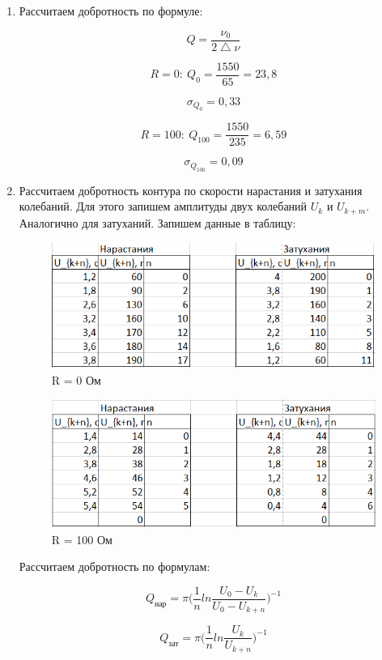 \documentclass[a4paper, 12pt]{article}%
\begin{document}
\begin{enumerate}
\item Рассчитаем добротность по формуле:

\[Q = \frac{\nu_0}{2 \bigtriangleup \nu}\]

\[R = 0: \: Q_0 = \frac{1550}{65} = 23,8\]

\[\sigma_{Q_0} = 0,33\]

\[R = 100: \: Q_{100} = \frac{1550}{235} = 6,59\]

\[\sigma_{Q_{100}} = 0,09\]

\item Рассчитаем добротность контура по скорости нарастания и затухания колебаний. Для этого запишем амплитуды двух колебаний $U_k$ и $U_{k + m}$. Аналогично для затуханий. Запишем данные в таблицу:

\begin{figure}[h!]
\centering
\includegraphics[scale=1]{table3.png}
\caption{R = 0 Ом}
\label{fig:Image1}
\end{figure}

\begin{figure}[h!]
\centering
\includegraphics[scale=1]{table4.png}
\caption{R = 100 Ом}
\label{fig:Image1}
\end{figure}

Рассчитаем добротность по формулам:

\[Q_{\text{нар}} = \pi \Big(\frac{1}{n} ln \frac{U_0 - U_k}{U_0 - U_{k+n}}\Big)^{-1}\]

\[Q_{\text{зат}} = \pi \Big(\frac{1}{n} ln \frac{U_k}{U_{k+n}}\Big)^{-1}\]


\end{enumerate}
\end{document}
